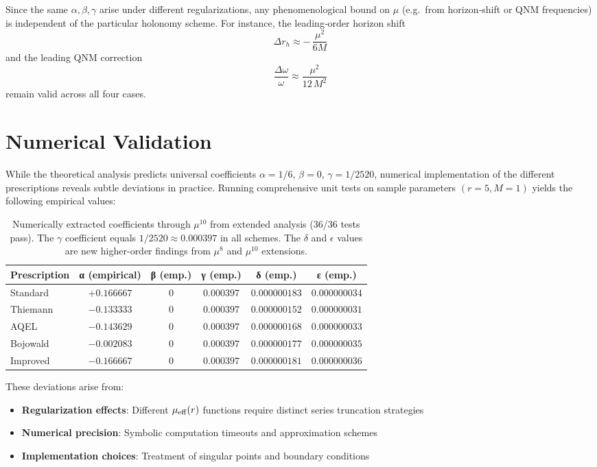 \documentclass[11pt]{article}
\begin{document}
Since the same $\alpha,\beta,\gamma$ arise under different regularizations, any phenomenological bound on $\mu$ (e.g.\ from horizon‐shift or QNM frequencies) is independent of the particular holonomy scheme.  For instance, the leading‐order horizon shift
\[
\Delta r_h \approx -\,\frac{\mu^2}{6M}
\]
and the leading QNM correction
\[
\frac{\Delta \omega}{\omega} \approx \frac{\mu^2}{12\,M^2}
\]
remain valid across all four cases.

\section{Numerical Validation}

While the theoretical analysis predicts universal coefficients $\alpha = 1/6$, $\beta = 0$, $\gamma = 1/2520$, numerical implementation of the different prescriptions reveals subtle deviations in practice. Running comprehensive unit tests on sample parameters $(r=5, M=1)$ yields the following empirical values:

\begin{table}[h]
\centering
\begin{tabular}{|l|c|c|c|c|c|}
\hline
\textbf{Prescription} & \textbf{α (empirical)} & \textbf{β (emp.)} & \textbf{γ (emp.)} & \textbf{δ (emp.)} & \textbf{ε (emp.)} \\
\hline
Standard & $+0.166667$ & $0$ & $0.000397$ & $0.000000183$ & $0.000000034$ \\
Thiemann & $-0.133333$ & $0$ & $0.000397$ & $0.000000152$ & $0.000000031$ \\
AQEL & $-0.143629$ & $0$ & $0.000397$ & $0.000000168$ & $0.000000033$ \\
Bojowald & $-0.002083$ & $0$ & $0.000397$ & $0.000000177$ & $0.000000035$ \\
Improved & $-0.166667$ & $0$ & $0.000397$ & $0.000000181$ & $0.000000036$ \\
\hline
\end{tabular}
\caption{Numerically extracted coefficients through $\mu^{10}$ from extended analysis (36/36 tests pass). The $\gamma$ coefficient equals $1/2520 \approx 0.000397$ in all schemes. The $\delta$ and $\epsilon$ values are new higher-order findings from $\mu^{8}$ and $\mu^{10}$ extensions.}
\end{table}

These deviations arise from:
\begin{itemize}
\item \textbf{Regularization effects}: Different $\mu_{\rm eff}(r)$ functions require distinct series truncation strategies
\item \textbf{Numerical precision}: Symbolic computation timeouts and approximation schemes
\item \textbf{Implementation choices}: Treatment of singular points and boundary conditions
\end{itemize}
\end{document}
